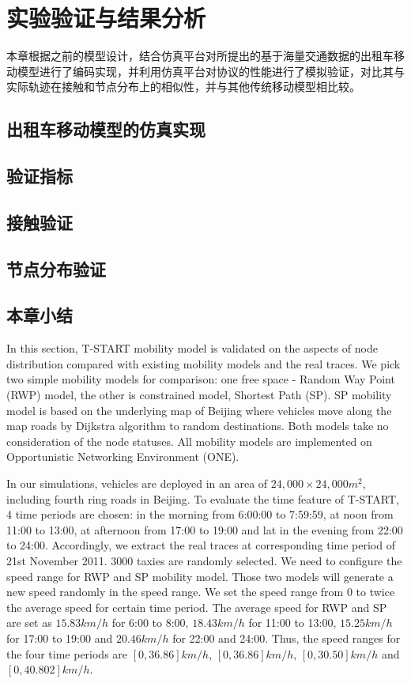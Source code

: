 \chapter{实验验证与结果分析}

本章根据之前的模型设计，结合仿真平台对所提出的基于海量交通数据的出租车移动模型进行了编码实现，并利用仿真平台对协议的性能进行了模拟验证，对比其与实际轨迹在接触和节点分布上的相似性，并与其他传统移动模型相比较。

\section{出租车移动模型的仿真实现}
\section{验证指标}
\section{接触验证}
\section{节点分布验证}
\section{本章小结}


In this section, T-START mobility model is validated on the aspects of node distribution compared with existing mobility models and the real traces. We pick two simple mobility models for comparison: one free space - Random Way Point (RWP) model, the other is constrained model, Shortest Path (SP).  SP mobility model is based on the underlying map of Beijing where vehicles move along the map roads by Dijkstra algorithm to random destinations. Both models take no consideration of the node statuses. All mobility models are implemented on Opportunistic Networking Environment (ONE)\cite{KeranenOtt-155}.

In our simulations, vehicles are deployed in an area of $24,000\times 24,000 m^2$, including fourth ring roads in Beijing.
To evaluate the time feature of T-START, 4 time periods are chosen: in the morning from 6:00:00 to 7:59:59, at noon from 11:00 to 13:00, at afternoon from 17:00 to 19:00 and lat in the evening from 22:00 to 24:00. Accordingly, we extract the real traces at corresponding time period of 21st November 2011.
3000 taxies are randomly selected. 
We need to configure the speed range for RWP and SP mobility model. Those two models will generate a new speed randomly in the speed range. We set the speed range from 0 to twice the average speed for certain time period.
The average speed for RWP and SP are set as $15.83km/h$ for 6:00 to 8:00, $18.43km/h$ for 11:00 to 13:00, $15.25km/h$ for 17:00 to 19:00 and $20.46km/h$ for 22:00 and 24:00. 
Thus, the speed ranges for the four time periods are $[0, 36.86]km/h$, $[0, 36.86]km/h$, $[0, 30.50]km/h$ and $[0, 40.802]km/h$.

